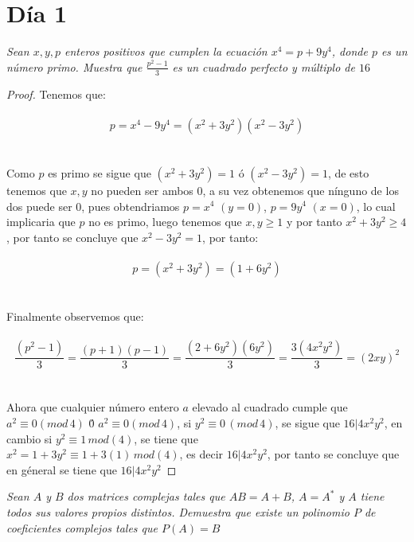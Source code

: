 \documentclass[11pt]{article}
\begin{document}
\section*{D\'ia 1}
\begin{tcolorbox}[
	title = \textcolor{black}{\textbf{\textcolor{white}{Problema 1\,(Teor\'ia de n\'umeros b\'asica)}}},
	]
\textit{Sean $x,y,p$ enteros positivos que cumplen la ecuaci\'on $x^4=p+9y^4$, donde $p$ es un n\'umero primo. Muestra que $\frac{p^2-1}{3}$ es un cuadrado perfecto y m\'ultiplo de $16$}
\end{tcolorbox}
\begin{proof}
Tenemos que:\,\\
\,\\
\begin{equation*}
    p=x^4-9y^4=(x^2+3y^2)(x^2-3y^2)
\end{equation*}\,\\
\,\\
Como $p$ es primo se sigue que $(x^2+3y^2)=1$ \'o $(x^2-3y^2)=1$, de esto tenemos que $x,y$ no pueden ser ambos $0$, a su vez obtenemos que n\'inguno de los dos puede ser $0$, pues obtendriamos $p=x^4\,\,(y=0)$, $p=9y^4\,\,(x=0)$, lo cual implicaria que $p$ no es primo, luego tenemos que $x,y\geq 1$ y por tanto $x^2+3y^2\geq 4$, por tanto se concluye que $x^2-3y^2=1$, por tanto:\,\\
\,\\
\begin{equation*}
    p=(x^2+3y^2)=(1+6y^2)
\end{equation*}\,\\
\,\\
Finalmente observemos que:\,\\
\,\\
\begin{equation*}
    \frac{(p^2-1)}{3}=\frac{(p+1)(p-1)}{3}=\frac{(2+6y^2)(6y^2)}{3}=\frac{3(4x^2y^2)}{3}=(2xy)^2
\end{equation*}\,\\
\,\\
Ahora que cualquier n\'umero entero $a$ elevado al cuadrado cumple que $a^2\equiv 0 (mod\,4)$ \'0 $a^2\equiv 0 (mod\,4)$, si $y^2\equiv 0\,(mod\,4)$, se sigue que $16|4x^2y^2$, en cambio si $y^2\equiv1\,mod(4)$, se tiene que \\ $x^2=1+3y^2\equiv 1+3(1)\,mod(4) $, es decir $16|4x^2y^2$, por tanto se concluye que en g\'eneral se tiene que $16|4x^2y^2$
\end{proof}
\newpage
\begin{tcolorbox}[
	title = \textcolor{black}{\textbf{\textcolor{white}{Problema 2\,(\'Algebra L\'ineal )}}},
	]
\textit{Sean $A$ y $B$ dos matrices complejas tales que $AB=A+B$, $A=A^*$ y $A$ tiene todos sus valores propios distintos. Demuestra que existe un polinomio $P$ de coeficientes complejos tales que $P(A)=B$}
\end{tcolorbox}
\end{document}

